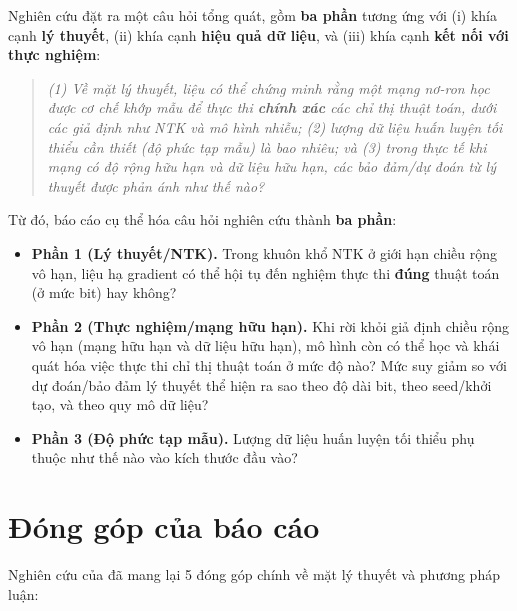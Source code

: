 Nghiên cứu đặt ra một câu hỏi tổng quát, gồm \textbf{ba phần} tương ứng với (i) khía cạnh \textbf{lý thuyết}, (ii) khía cạnh \textbf{hiệu quả dữ liệu}, và (iii) khía cạnh \textbf{kết nối với thực nghiệm}:
\begin{quote}
    	\textit{(1) Về mặt lý thuyết, liệu có thể chứng minh rằng một mạng nơ-ron học được cơ chế khớp mẫu để thực thi \textbf{chính xác} các chỉ thị thuật toán, dưới các giả định như NTK và mô hình nhiễu; (2) lượng dữ liệu huấn luyện tối thiểu cần thiết (độ phức tạp mẫu) là bao nhiêu; và (3) trong thực tế khi mạng có độ rộng hữu hạn và dữ liệu hữu hạn, các bảo đảm/dự đoán từ lý thuyết được phản ánh như thế nào?}
\end{quote}


Từ đó, báo cáo cụ thể hóa câu hỏi nghiên cứu thành \textbf{ba phần}:

\begin{itemize}
    \item \textbf{Phần 1 (Lý thuyết/NTK).} Trong khuôn khổ NTK ở giới hạn chiều rộng vô hạn, liệu hạ gradient có thể hội tụ đến nghiệm thực thi \textbf{đúng} thuật toán (ở mức bit) hay không?
    \item \textbf{Phần 2 (Thực nghiệm/mạng hữu hạn).} Khi rời khỏi giả định chiều rộng vô hạn (mạng hữu hạn và dữ liệu hữu hạn), mô hình còn có thể học và khái quát hóa việc thực thi chỉ thị thuật toán ở mức độ nào? Mức suy giảm so với dự đoán/bảo đảm lý thuyết thể hiện ra sao theo độ dài bit, theo seed/khởi tạo, và theo quy mô dữ liệu?
    \item \textbf{Phần 3 (Độ phức tạp mẫu).} Lượng dữ liệu huấn luyện tối thiểu phụ thuộc như thế nào vào kích thước đầu vào?
\end{itemize}

\section{Đóng góp của báo cáo}

Nghiên cứu của đã mang lại 5 đóng góp chính về mặt lý thuyết và phương pháp luận:

